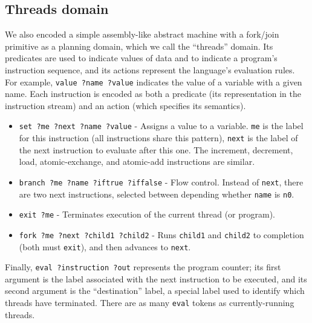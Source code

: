 \subsection{Threads domain}

We also encoded a simple assembly-like abstract machine with a fork/join primitive as a planning domain, which we call the ``threads'' domain.
Its predicates are used to indicate values of data and to indicate a program's instruction sequence, and
its actions represent the language's evaluation rules. For example, \texttt{value ?name ?value} indicates the value of a variable with a given name. Each instruction is encoded as both a predicate (its representation in the instruction stream) and an action (which specifies its semantics).
%
\begin{itemize}
	\item \texttt{set ?me ?next ?name ?value} - Assigns a value to a variable. \texttt{me} is the label for this instruction (all instructions share this pattern), \texttt{next} is the label of the next instruction to evaluate after this one. The increment, decrement, load, atomic-exchange, and atomic-add instructions are similar.
	\item \texttt{branch ?me ?name ?iftrue ?iffalse} - Flow control. Instead of \texttt{next}, there are two next instructions, selected between depending whether \texttt{name} is \texttt{n0}.
	\item \texttt{exit ?me} - Terminates execution of the current thread (or program).
	\item \texttt{fork ?me ?next ?child1 ?child2} - Runs \texttt{child1} and \texttt{child2} to completion (both must \texttt{exit}), and then advances to \texttt{next}.
\end{itemize}
%
Finally, \texttt{eval ?instruction ?out} represents the program counter; its first argument is the label associated with the next instruction to be executed, and its second argument is the ``destination'' label, a special label used to identify which threads have terminated. There are as many \texttt{eval} tokens as currently-running threads.

